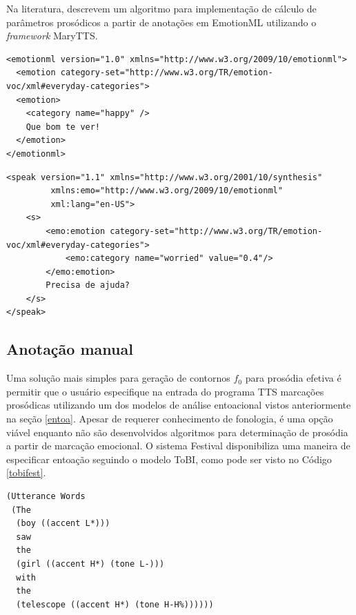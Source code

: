 Na literatura,  descrevem um algoritmo para implementação de
cálculo de parâmetros prosódicos a partir de anotações em EmotionML utilizando o
\emph{framework} MaryTTS.



\begin{lstlisting}[caption=Exemplo de texto anotado com EmotionML com parâmetros
  discretos, label=lst:discreto]
<emotionml version="1.0" xmlns="http://www.w3.org/2009/10/emotionml">
  <emotion category-set="http://www.w3.org/TR/emotion-voc/xml#everyday-categories">
  <emotion>
    <category name="happy" />
    Que bom te ver!
  </emotion>
</emotionml>
\end{lstlisting}

\begin{lstlisting}[caption=Exemplo de texto anotado com SSML e EmotionML
  (adaptado de \cite{emotionml}), label=lst:ssmlemotion]
<speak version="1.1" xmlns="http://www.w3.org/2001/10/synthesis"
         xmlns:emo="http://www.w3.org/2009/10/emotionml"
         xml:lang="en-US">
    <s>
        <emo:emotion category-set="http://www.w3.org/TR/emotion-voc/xml#everyday-categories">
            <emo:category name="worried" value="0.4"/>
        </emo:emotion>
        Precisa de ajuda?
    </s>
</speak>
\end{lstlisting}


\subsection{Anotação manual}
Uma solução mais simples para geração de contornos $ f_0 $ para prosódia efetiva é
permitir que o usuário especifique na entrada do programa TTS marcações
prosódicas utilizando um dos modelos de análise entoacional vistos
anteriormente na seção \ref{entoa}. Apesar de requerer conhecimento de
fonologia, é uma opção viável enquanto não são desenvolvidos algoritmos para
determinação de prosódia a partir de marcação emocional. O sistema Festival
\cite{festival} disponibiliza uma maneira de especificar entoação seguindo o
modelo ToBI, como pode ser visto no Código \ref{tobifest}.

\begin{lstlisting}[caption=Anotações no modelo ToBI para o sistema TTS Festival,
  label=tobifest]
(Utterance Words 
 (The
  (boy ((accent L*)))
  saw
  the
  (girl ((accent H*) (tone L-)))
  with 
  the
  (telescope ((accent H*) (tone H-H%))))))
\end{lstlisting}
